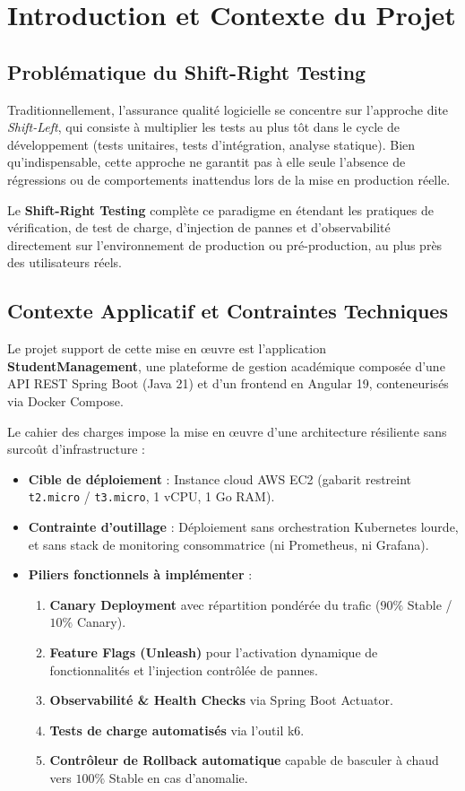 \documentclass[12pt,a4paper]{article}
\begin{document}
\section{Introduction et Contexte du Projet}

\subsection{Problématique du Shift-Right Testing}
Traditionnellement, l'assurance qualité logicielle se concentre sur l'approche dite \textit{Shift-Left}, qui consiste à multiplier les tests au plus tôt dans le cycle de développement (tests unitaires, tests d'intégration, analyse statique). Bien qu'indispensable, cette approche ne garantit pas à elle seule l'absence de régressions ou de comportements inattendus lors de la mise en production réelle.

Le \textbf{Shift-Right Testing} complète ce paradigme en étendant les pratiques de vérification, de test de charge, d'injection de pannes et d'observabilité directement sur l'environnement de production ou pré-production, au plus près des utilisateurs réels.

\subsection{Contexte Applicatif et Contraintes Techniques}
Le projet support de cette mise en œuvre est l'application \textbf{StudentManagement}, une plateforme de gestion académique composée d'une API REST Spring Boot (Java 21) et d'un frontend en Angular 19, conteneurisés via Docker Compose.

Le cahier des charges impose la mise en œuvre d'une architecture résiliente sans surcoût d'infrastructure :
\begin{itemize}
    \item \textbf{Cible de déploiement} : Instance cloud AWS EC2 (gabarit restreint \texttt{t2.micro} / \texttt{t3.micro}, 1 vCPU, 1 Go RAM).
    \item \textbf{Contrainte d'outillage} : Déploiement sans orchestration Kubernetes lourde, et sans stack de monitoring consommatrice (ni Prometheus, ni Grafana).
    \item \textbf{Piliers fonctionnels à implémenter} :
    \begin{enumerate}
        \item \textbf{Canary Deployment} avec répartition pondérée du trafic ($90\%$ Stable / $10\%$ Canary).
        \item \textbf{Feature Flags (Unleash)} pour l'activation dynamique de fonctionnalités et l'injection contrôlée de pannes.
        \item \textbf{Observabilité & Health Checks} via Spring Boot Actuator.
        \item \textbf{Tests de charge automatisés} via l'outil k6.
        \item \textbf{Contrôleur de Rollback automatique} capable de basculer à chaud vers $100\%$ Stable en cas d'anomalie.
    \end{enumerate}
\end{itemize}
\end{document}
